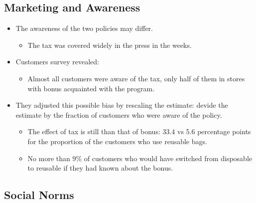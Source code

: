 \documentclass[../root]{subfiles}
\begin{document}
    \subsection{Marketing and Awareness}

    \begin{itemize}
      \item The awareness of the two policies may differ.
      \begin{itemize}
        \item The tax was covered widely in the press in the weeks.
      \end{itemize}
      \item Customers survey revealed:
      \begin{itemize}
        \item Almost all customers were aware of the tax, only half of them in stores with bonus acquainted with the program.
      \end{itemize}
      \item They adjusted this possible bias by rescaling the estimate: devide the estimate by the fraction of customers who were aware of the policy.
      \begin{itemize}
        \item The effect of tax is still than that of bonus: 33.4 vs 5.6 percentage points for the proportion of the customers who use reusable bags.
        \item No more than 9\% of customers who would have switched from disposable to reusable if they had known about the bonus.
      \end{itemize}
    \end{itemize}

    \subsection{Social Norms}
\end{document}
